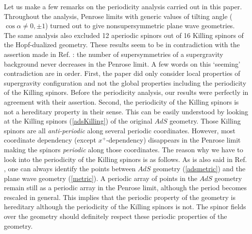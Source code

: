 \documentclass[a4paper,12pt]{article}
\begin{document}
Let us make a few remarks on the periodicity analysis carried out in this paper. Throughout the analysis, Penrose limits with generic values of tilting angle ($\cos{\alpha}\ne 0,\pm 1$) turned out to give nonsupersymmetric plane wave geometries. The same analysis also excluded 12 aperiodic spinors out of 16 Killing spinors of the Hopf-dualized geometry. These results seem to be in contradiction with the assertion made in Ref. \cite{blau3}: the number of supersymmetries of a supergravity background never decreases in the Penrose limit. A few words on this `seeming' contradiction are in order. First, the paper \cite{blau3} did only consider local properties of supergravity configuration and not the global properties including the periodicity of the Killing spinors. Before the periodicity analysis, our results were perfectly in agreement with their assertion. Second, the periodicity of the Killing spinors is not a hereditary property in their sense. This can be easily understood by looking at the Killing spinors (\ref{adsKilling}) of the original $AdS$ geometry. Those Killing spinors are all {\it anti-periodic} along several periodic coordinates. However, most coordinate dependency (except $x^+$-dependency) disappears in the Penrose limit making the spinors {\it periodic} along those coordinates. The reason why we have to look into the periodicity of the Killing spinors is as follows. As is also said in Ref. \cite{blau3}, one can always identify the points between $AdS$ geometry (\ref{adsmetric}) and the plane wave geometry (\ref{metric}). A periodic array of points in the $AdS$ geometry remain still as a periodic array in the Penrose limit, although the period becomes rescaled in general. This implies that the periodic property of the geometry is hereditary although the periodicity of the Killing spinors is not. The spinor fields over the geometry should definitely respect these periodic properties of the geometry.
\end{document}
